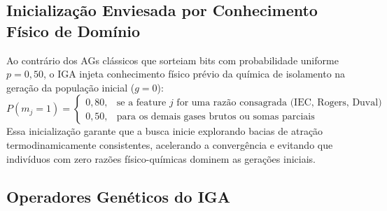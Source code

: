 \documentclass[11pt,a4paper]{article}
\begin{document}
\subsection{Inicialização Enviesada por Conhecimento Físico de Domínio}
Ao contrário dos AGs clássicos que sorteiam bits com probabilidade uniforme $p=0{,}50$, o IGA injeta conhecimento físico prévio da química de isolamento na geração da população inicial ($g=0$):
\begin{equation}
  P(m_j = 1) = \begin{cases}
    0{,}80, & \text{se a feature } j \text{ for uma razão consagrada (IEC, Rogers, Duval)} \\
    0{,}50, & \text{para os demais gases brutos ou somas parciais}
  \end{cases}
\end{equation}
Essa inicialização garante que a busca inicie explorando bacias de atração termodinamicamente consistentes, acelerando a convergência e evitando que indivíduos com zero razões físico-químicas dominem as gerações iniciais.

\subsection{Operadores Genéticos do IGA}
\end{document}
